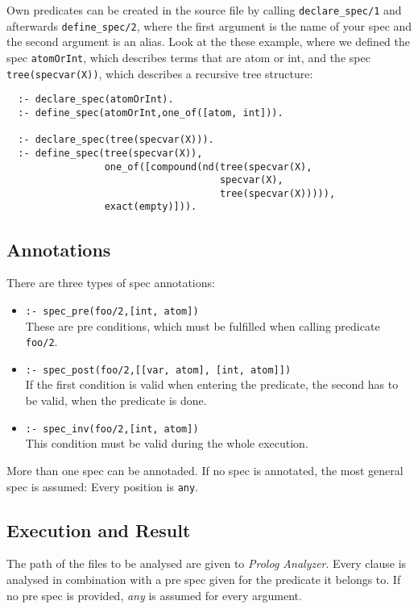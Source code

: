 \documentclass[a4paper]{article}
\newcommand{\prologAnalyzer}{\textit{Prolog Analyzer}}
\begin{document}
Own predicates can be created in the source file by calling \texttt{declare\_spec/1} and afterwards \texttt{define\_spec/2}, where the
first argument is the name of your spec and the second argument is an alias.
Look at the these example, where we defined the spec \texttt{atomOrInt}, which
describes terms that are atom or int, and the spec \texttt{tree(specvar(X))},
which describes a recursive tree structure:
\begin{lstlisting}
  :- declare_spec(atomOrInt).
  :- define_spec(atomOrInt,one_of([atom, int])).

  :- declare_spec(tree(specvar(X))).
  :- define_spec(tree(specvar(X)),
                 one_of([compound(nd(tree(specvar(X),
                                     specvar(X),
                                     tree(specvar(X))))),
                 exact(empty)])).
               \end{lstlisting}

         
\subsection{Annotations}
\label{subsection:annotations}
There are three types of spec annotations:
\begin{itemize}
\item{\texttt{:- spec\_pre(foo/2,[int, atom])}}\hfill\\
  These are pre conditions, which must be fulfilled when calling predicate \texttt{foo/2}.  
\item{\texttt{:- spec\_post(foo/2,[[var, atom], [int, atom]])}}\hfill\\
  If the first condition is valid when entering the predicate, the second has to
  be valid, when the predicate is done.
\item{\texttt{:- spec\_inv(foo/2,[int, atom])}}\hfill\\
  This condition must be valid during the whole execution.
\end{itemize}

More than one spec can be annotaded. If no spec is annotated, the most general
spec is assumed: Every position is \texttt{any}.

\subsection{Execution and Result}
The path of the files to be analysed are given to \prologAnalyzer{}.
Every clause is analysed in combination with a pre spec given for the predicate
it belongs to. If no pre spec is provided, \textit{any} is assumed for every
argument.
\end{document}
